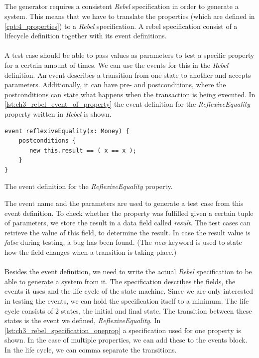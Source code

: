 \subsection{\tfPhaseOne{}}
\label{sct:3_prop_to_rebel}
The generator requires a consistent \textit{Rebel} specification in order to generate a system. This means that we have to translate the properties (which are defined in \autoref{cpt:4_properties}) to a \textit{Rebel} specification. A rebel specification consist of a lifecycle definition together with its event definitions.\\
\\
A test case should be able to pass values as parameters to test a specific property for a certain amount of times. We can use the events for this in the \textit{Rebel} definition. An event describes a transition from one state to another and accepts parameters. Additionally, it can have pre- and postconditions, where the postconditions can state what happens when the transaction is being executed. In \autoref{lst:ch3_rebel_event_of_property} the event definition for the \textit{ReflexiveEquality} property written in \textit{Rebel} is shown.
\FloatBarrier
\begin{sourcecode}[!ht]
\begin{lstlisting}[language=Rebel]
event reflexiveEquality(x: Money) {
    postconditions {
       new this.result == ( x == x );
    }
}
\end{lstlisting}
\caption{The event definition for the \textit{ReflexiveEquality} property.}
\label{lst:ch3_rebel_event_of_property}
\end{sourcecode}
\FloatBarrier
The event name and the parameters are used to generate a test case from this event definition. To check whether the property was fulfilled given a certain tuple of parameters, we store the result in a data field called \textit{result}. The test cases can retrieve the value of this field, to determine the result. In case the result value is \textit{false} during testing, a bug has been found. (The \textit{new} keyword is used to state how the field changes when a transition is taking place.)\\
\\
Besides the event definition, we need to write the actual \textit{Rebel} specification to be able to generate a system from it. The specification describes the fields, the events it uses and the life cycle of the state machine. Since we are only interested in testing the events, we can hold the specification itself to a minimum. The life cycle consists of 2 states, the initial and final state. The transition between these states is the event we defined, \textit{ReflexiveEquality}. In \autoref{lst:ch3_rebel_specification_oneprop} a specification used for one property is shown. In the case of multiple properties, we can add these to the events block. In the life cycle, we can comma separate the transitions.
